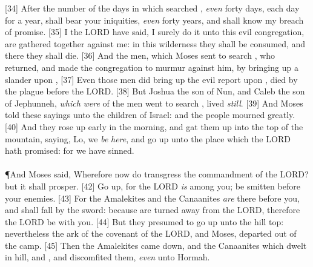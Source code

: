 [34] \textcolor[cmyk]{0.99998,1,0,0}{After the number of the days in which  searched , \emph{even} forty days, each day for a year, shall  bear your iniquities, \emph{even} forty years, and  shall know my breach of promise.}
[35] \textcolor[cmyk]{0.99998,1,0,0}{I the LORD have said, I  surely do it unto  this evil congregation,   are gathered together against me: in this wilderness they shall be consumed, and there they shall die.}
[36] \textcolor[cmyk]{0.99998,1,0,0}{And the men, which Moses sent to search , who returned, and made  the congregation to murmur against him, by bringing up a slander upon ,}
[37] \textcolor[cmyk]{0.99998,1,0,0}{Even those men   did bring up the evil report upon , died by the plague before the LORD.}
[38] \textcolor[cmyk]{0.99998,1,0,0}{But Joshua the son of Nun, and Caleb the son of Jephunneh, \emph{which} \emph{were} of the men   went to search , lived \emph{still}.}
[39] \textcolor[cmyk]{0.99998,1,0,0}{And Moses told these sayings unto  the children of Israel: and the people mourned greatly.}
[40] \textcolor[cmyk]{0.99998,1,0,0}{And they rose up early in the morning, and gat them up into the top of the mountain, saying, Lo, we \emph{be} \emph{here}, and  go up unto the place which the LORD hath promised: for we have sinned.}\\
\\
\P \textcolor[cmyk]{0.99998,1,0,0}{And Moses said, Wherefore now do  transgress the commandment of the LORD? but it shall  prosper.}
[42] \textcolor[cmyk]{0.99998,1,0,0}{Go  up, for the LORD \emph{is}  among you;    be  smitten before your enemies.}
[43] \textcolor[cmyk]{0.99998,1,0,0}{For the Amalekites and the Canaanites \emph{are} there before you, and  shall fall by the sword: because  are turned away from the LORD, therefore the LORD   be with you.}
[44] \textcolor[cmyk]{0.99998,1,0,0}{But they presumed to go up unto the hill top: nevertheless the ark of the covenant of the LORD, and Moses, departed  out of the camp.}
[45] \textcolor[cmyk]{0.99998,1,0,0}{Then the Amalekites came down, and the Canaanites which dwelt in   hill, and , and discomfited them, \emph{even} unto Hormah.}